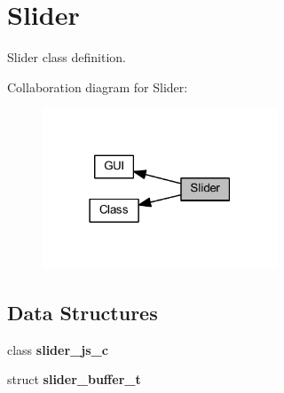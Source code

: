\section{Slider}
\label{group___slider}


Slider class definition.  


Collaboration diagram for Slider\+:
\nopagebreak
\begin{figure}[H]
\begin{center}
\leavevmode
\includegraphics[width=198pt]{group___slider}
\end{center}
\end{figure}
\subsection*{Data Structures}
\begin{DoxyCompactItemize}
\item 
class \textbf{ slider\+\_\+js\+\_\+c}
\item 
struct \textbf{ slider\+\_\+buffer\+\_\+t}
\end{DoxyCompactItemize}
